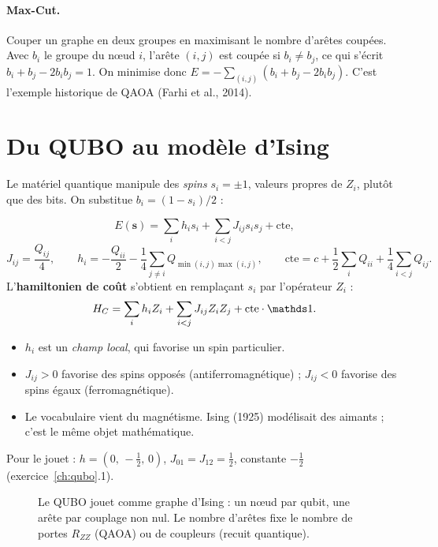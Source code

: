 \paragraph{Max-Cut.} Couper un graphe en deux groupes en maximisant le nombre d'arêtes coupées. Avec $b_i$ le groupe du nœud $i$, l'arête $(i,j)$ est coupée si $b_i\neq b_j$, ce qui s'écrit $b_i+b_j-2b_ib_j=1$. On minimise donc $E=-\sum_{(i,j)}(b_i+b_j-2b_ib_j)$. C'est l'exemple historique de QAOA (Farhi et al., 2014).

\section{Du QUBO au modèle d'Ising}
Le matériel quantique manipule des \emph{spins} $s_i=\pm1$, valeurs propres de $Z_i$, plutôt que des bits. On substitue $b_i=(1-s_i)/2$ :
\begin{definition}
\[E(\mathbf s)=\sum_ih_is_i+\sum_{i<j}J_{ij}s_is_j+\text{cte},\]
\[J_{ij}=\frac{Q_{ij}}4,\qquad h_i=-\frac{Q_{ii}}2-\frac14\sum_{j\neq i}Q_{\min(i,j)\max(i,j)},\qquad \text{cte}=c+\frac12\sum_iQ_{ii}+\frac14\sum_{i<j}Q_{ij}.\]
L'\textbf{hamiltonien de coût} s'obtient en remplaçant $s_i$ par l'opérateur $Z_i$ :
\[H_C=\sum_ih_iZ_i+\sum_{i<j}J_{ij}Z_iZ_j+\text{cte}\cdot\Id .\]
\end{definition}
\begin{itemize}
\item $h_i$ est un \emph{champ local}, qui favorise un spin particulier.
\item $J_{ij}>0$ favorise des spins opposés (antiferromagnétique) ; $J_{ij}<0$ favorise des spins égaux (ferromagnétique).
\item Le vocabulaire vient du magnétisme. Ising (1925) modélisait des aimants ; c'est le même objet mathématique.
\end{itemize}
Pour le jouet : $h=(0,\,-\tfrac12,\,0)$, $J_{01}=J_{12}=\tfrac12$, constante $-\tfrac12$ (exercice~\ref{ch:qubo}.1).

\begin{figure}[htbp]
\centering
{}
\caption{Le QUBO jouet comme graphe d'Ising : un nœud par qubit, une arête par couplage non nul. Le nombre d'arêtes fixe le nombre de portes $R_{ZZ}$ (QAOA) ou de coupleurs (recuit quantique).}\label{fig:graphe-jouet}
\end{figure}

